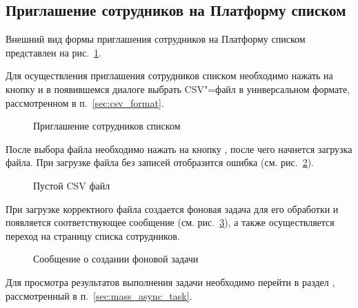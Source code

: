 \subsection{Приглашение сотрудников на Платформу списком}
Внешний вид формы приглашения сотрудников на Платформу списком представлен на рис.~\ref{img:employee:mass_invite}. 

Для осуществления приглашения сотрудников списком необходимо нажать на кнопку  и в появившемся диалоге 
выбрать CSV"=файл в универсальном формате, рассмотренном в п.~\ref{sec:csv_format}. 

\begin{figure}[H]
	\caption{Приглашение сотрудников списком}
	\label{img:employee:mass_invite}
\end{figure}

После выбора файла необходимо нажать на кнопку , после чего начнется загрузка файла.
При загрузке файла без записей отобразится ошибка (см. рис.~\ref{img:employee:mass_invite_empty_csv}).
\begin{figure}[H]
	\caption{Пустой CSV файл}
	\label{img:employee:mass_invite_empty_csv}
\end{figure}

При загрузке корректного файла создается фоновая задача для его обработки и появляется соответствующее сообщение 
(см. рис.~\ref{img:employee:mass_invite_task}), а также осуществляется переход на страницу списка сотрудников.

\begin{figure}[H]
	\caption{Сообщение о создании фоновой задачи}
	\label{img:employee:mass_invite_task}
\end{figure}
Для просмотра результатов выполнения задачи необходимо перейти в раздел , 
рассмотренный в п.~\ref{sec:mass_async_task}.

